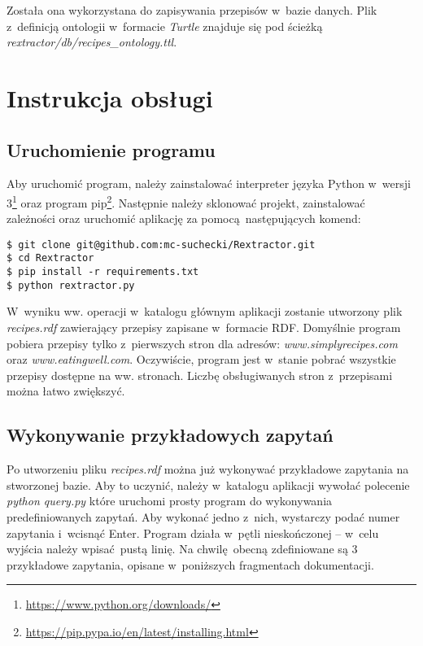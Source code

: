 \documentclass[11pt,a4paper]{article}
\begin{document}
Została ona wykorzystana do zapisywania przepisów w~bazie danych. Plik z~definicją ontologii w~formacie \textit{Turtle} znajduje się pod ścieżką \textit{rextractor/db/recipes\_ontology.ttl}.

\newpage
\section{Instrukcja obsługi}
\subsection{Uruchomienie programu}
Aby uruchomić program, należy zainstalować interpreter języka Python w~wersji 3\footnote{\url{https://www.python.org/downloads/}} oraz program pip\footnote{\url{https://pip.pypa.io/en/latest/installing.html}}. Następnie należy sklonować projekt, zainstalować zależności oraz uruchomić aplikację za pomocą następujących komend:\\

\begin{lstlisting}
$ git clone git@github.com:mc-suchecki/Rextractor.git
$ cd Rextractor
$ pip install -r requirements.txt
$ python rextractor.py
\end{lstlisting}

W~wyniku ww. operacji w~katalogu głównym aplikacji zostanie utworzony plik \textit{recipes.rdf} zawierający przepisy zapisane w~formacie RDF. Domyślnie program pobiera przepisy tylko z~pierwszych stron dla adresów: \textit{www.simplyrecipes.com} oraz \textit{www.eatingwell.com}. Oczywiście, program jest w~stanie pobrać wszystkie przepisy dostępne na ww. stronach. Liczbę obsługiwanych stron z~przepisami można łatwo zwiększyć.

\subsection{Wykonywanie przykładowych zapytań}
Po utworzeniu pliku \textit{recipes.rdf} można już wykonywać przykładowe zapytania na stworzonej bazie. Aby to uczynić, należy w~katalogu aplikacji wywołać polecenie \textit{python query.py} które uruchomi prosty program do wykonywania predefiniowanych zapytań. Aby wykonać jedno z~nich, wystarczy podać numer zapytania i~wcisnąć Enter. Program działa w~pętli nieskończonej -- w~celu wyjścia należy wpisać pustą linię. Na chwilę obecną zdefiniowane są 3 przykładowe zapytania, opisane w~poniższych fragmentach dokumentacji.
\end{document}
